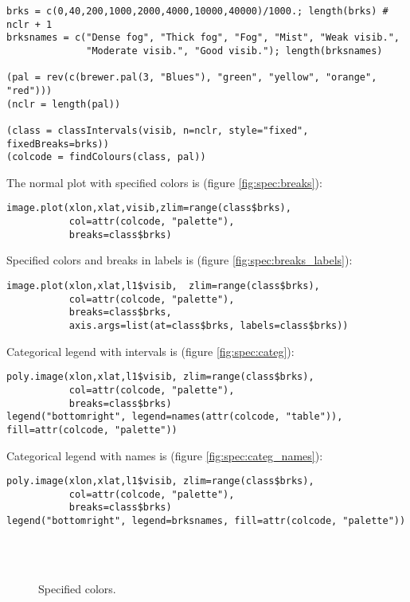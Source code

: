\documentclass[a4paper,10pt]{article}
\begin{document}
\begin{verbatim}
brks = c(0,40,200,1000,2000,4000,10000,40000)/1000.; length(brks) # nclr + 1
brksnames = c("Dense fog", "Thick fog", "Fog", "Mist", "Weak visib.", 
              "Moderate visib.", "Good visib."); length(brksnames)

(pal = rev(c(brewer.pal(3, "Blues"), "green", "yellow", "orange", "red")))
(nclr = length(pal))

(class = classIntervals(visib, n=nclr, style="fixed", fixedBreaks=brks))
(colcode = findColours(class, pal))
\end{verbatim} 

The normal plot with specified colors is (figure \ref{fig:spec:breaks}):

\begin{verbatim}
image.plot(xlon,xlat,visib,zlim=range(class$brks),
           col=attr(colcode, "palette"),  
           breaks=class$brks)
\end{verbatim} 

Specified colors and breaks in labels is (figure \ref{fig:spec:breaks_labels}):

\begin{verbatim}
image.plot(xlon,xlat,l1$visib,  zlim=range(class$brks),
           col=attr(colcode, "palette"), 
           breaks=class$brks,
           axis.args=list(at=class$brks, labels=class$brks))
\end{verbatim} 

Categorical legend with intervals is (figure \ref{fig:spec:categ}):

\begin{verbatim}
poly.image(xlon,xlat,l1$visib, zlim=range(class$brks),
           col=attr(colcode, "palette"), 
           breaks=class$brks)
legend("bottomright", legend=names(attr(colcode, "table")), fill=attr(colcode, "palette"))
\end{verbatim} 


Categorical legend with names is (figure \ref{fig:spec:categ_names}):

\begin{verbatim}
poly.image(xlon,xlat,l1$visib, zlim=range(class$brks),
           col=attr(colcode, "palette"), 
           breaks=class$brks)
legend("bottomright", legend=brksnames, fill=attr(colcode, "palette"))

\end{verbatim} 

\begin{figure}[!htp]
  \centering
  \\
  \\
  \caption{Specified colors.} 
  \label{fig:spec1}
\end{figure}
\end{document}
